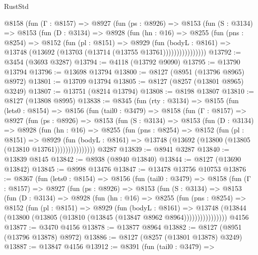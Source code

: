 \begin{lexlean}{RustStd}
\begin{coremodule}
          @8158
            (fun (Γ : @8157) =>
            @8927
              (fun (ps : @8926) =>
              @8153
                (fun (S : @3134) =>
                @8153
                  (fun (D : @3134) =>
                  @8928
                    (fun (hn : @16) =>
                    @8255
                      (fun (pns : @8254) =>
                      @8152
                        (fun (pl : @8151) =>
                        @8929
                          (fun (bodyL : @8161) =>
                          @13748 (@13692 (@13703 (@13714 (@13755 @13761))))))))))))))))
@13792 := @3454 (@3693 @3287)
@13794 := @4118 (@13792 @9090)
@13795 := @13790 @13794
@13796 := @13698 @13794
@13800 := @8127 (@8951 (@13796 @8965) @8972)
@13801 := @13709 @13794
@13805 := @8127 (@8257 (@13801 @8965) @3249)
@13807 := @13751 (@8214 @13794)
@13808 := @8198 @13807
@13810 := @8127 (@13808 @8995)
@13838 := @8345
    (fun (rty : @3134) =>
    @8155
      (fun (lets0 : @8154) =>
      @8156
        (fun (tail0 : @3479) =>
        @8158
          (fun (Γ : @8157) =>
          @8927
            (fun (ps : @8926) =>
            @8153
              (fun (S : @3134) =>
              @8153
                (fun (D : @3134) =>
                @8928
                  (fun (hn : @16) =>
                  @8255
                    (fun (pns : @8254) =>
                    @8152
                      (fun (pl : @8151) =>
                      @8929
                        (fun (bodyL : @8161) =>
                        @13748 (@13692 (@13800 (@13805 (@13810 @13761)))))))))))))))
    @3287
@13839 := @8941 @3287
@13840 := @13839 @8145
@13842 := @8938 (@8940 @13840)
@13844 := @8127 (@13690 @13842)
@13845 := @8998 @13476
@13847 := @13478 @13756 @10753
@13876 := @8367
    (fun (lets0 : @8154) =>
    @8156
      (fun (tail0 : @3479) =>
      @8158
        (fun (Γ : @8157) =>
        @8927
          (fun (ps : @8926) =>
          @8153
            (fun (S : @3134) =>
            @8153
              (fun (D : @3134) =>
              @8928
                (fun (hn : @16) =>
                @8255
                  (fun (pns : @8254) =>
                  @8152
                    (fun (pl : @8151) =>
                    @8929
                      (fun (bodyL : @8161) =>
                      @13748
                        (@13844 (@13800 (@13805 (@13810 (@13845 (@13847 @8962 @8964))))))))))))))))
    @4156
@13877 := @3470 @4156
@13878 := @13877 @8964
@13882 := @8127 (@8951 (@13796 @13878) @8972)
@13886 := @8127 (@8257 (@13801 @13878) @3249)
@13887 := @13847 @4156
@13912 := @8391
    (fun (tail0 : @3479) =>

\end{coremodule}
\end{lexlean}
